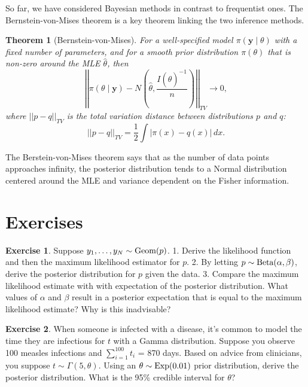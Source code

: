 \documentclass[
]{book}
\newtheorem{theorem}{Theorem}[chapter]
\theoremstyle{definition}
\theoremstyle{definition}
\theoremstyle{definition}
\newtheorem{exercise}{Exercise}[chapter]
\theoremstyle{definition}
\theoremstyle{remark}
\begin{document}
So far, we have considered Bayesian methods in contrast to frequentist ones. The Bernstein-von-Mises theorem is a key theorem linking the two inference methods.

\begin{theorem}[Bernstein-von-Mises]
For a well-specified model \(\pi(\boldsymbol{y} \mid \theta)\) with a fixed number of parameters, and for a smooth prior distribution \(\pi(\theta)\) that is non-zero around the MLE \(\hat{\theta}\), then
\[
\left|\left| \pi(\theta \mid \boldsymbol{y}) - N\left(\hat{\theta}, \frac{I(\hat{\theta})^{-1}}{n}\right) \right|\right|_{TV} \rightarrow 0,
\]
where \(||p - q||_{TV}\) is the total variation distance between distributions \(p\) and \(q\):
\[
||p - q||_{TV} = \frac{1}{2}\int|\pi(x) - q(x)|\,dx.
\]
\end{theorem}

The Berstein-von-Mises theorem says that as the number of data points approaches infinity, the posterior distribution tends to a Normal distribution centered around the MLE and variance dependent on the Fisher information.

\hypertarget{exercises-1}{%
\section{Exercises}\label{exercises-1}}

\begin{exercise}
Suppose \(y_1, \ldots, y_N \sim \hbox{Geom}(p)\).
1. Derive the likelihood function and then the maximum likelihood estimator for \(p\).
2. By letting \(p \sim \hbox{Beta}(\alpha, \beta)\), derive the posterior distribution for \(p\) given the data.
3. Compare the maximum likelihood estimate with with expectation of the posterior distribution. What values of \(\alpha\) and \(\beta\) result in a posterior expectation that is equal to the maximum likelihood estimate? Why is this inadvisable?
\end{exercise}

\begin{exercise}
When someone is infected with a disease, it's common to model the time they are infectious for \(t\) with a Gamma distribution. Suppose you observe 100 measles infections and \(\sum_{i=1}^{100}t_i\) = 870 days. Based on advice from clinicians, you suppose \(t \sim \Gamma(5, \theta)\). Using an \(\theta \sim \hbox{Exp}(0.01)\) prior distribution, derive the posterior distribution. What is the 95\% credible interval for \(\theta\)?
\end{exercise}
\end{document}
